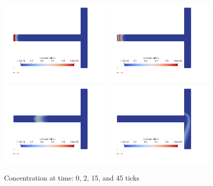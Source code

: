 \begin{figure}[H]
\centering
\includegraphics[width=0.48\textwidth]{time-0-ticks}
\includegraphics[width=0.48\textwidth]{time-2-ticks}
\includegraphics[width=0.48\textwidth]{time-15-ticks}
\includegraphics[width=0.48\textwidth]{time-45-ticks}
\caption{Concentration at time: 0, 2, 15, and 45 ticks}\label{fg:time}
\end{figure} 


\hfill
